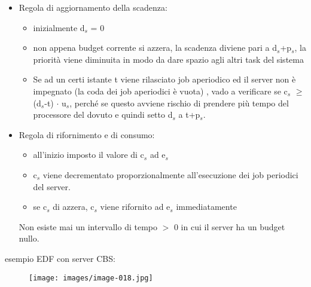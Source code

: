\documentclass[12pt, oneside]{extbook}
\begin{document}
\begin{itemize}
\item Regola di aggiornamento della scadenza:
\begin{itemize}
\item inizialmente d$_{s}$ = 0
\item non appena budget corrente si azzera, la scadenza diviene pari a d$_{s}$+p$_{s}$, la priorità viene diminuita in modo da dare spazio agli altri task del sistema
\item Se ad un certi istante t viene rilasciato job aperiodico ed il server non è impegnato (la coda dei job aperiodici è vuota) , vado a verificare se c$_{s}$ $\geq$ (d$_{s}$-t) $\cdot$ u$_{s}$, perché se questo avviene rischio di prendere più tempo del processore del dovuto e quindi setto d$_{s}$ a t+p$_{s}$.
\end{itemize}
\item Regola di rifornimento e di consumo:
\begin{itemize}
\item all'inizio imposto il valore di c$_{s}$ ad e$_{s}$
\item c$_{s}$ viene decrementato proporzionalmente all'esecuzione dei job periodici del server.
\item se c$_{s}$ di azzera, c$_{s}$ viene rifornito ad e$_{s}$ immediatamente
\end{itemize}
Non esiste mai un intervallo di tempo $>$ 0 in cui il server ha un budget nullo.
\end{itemize}
esempio EDF con server CBS:
\begin{figure}[!h]
\centering
\texttt{[image: images/image-018.jpg]}
\end{figure}
\end{document}
